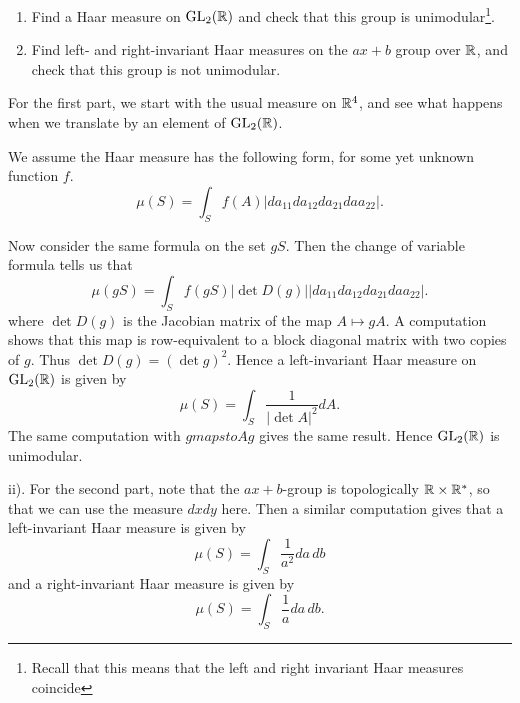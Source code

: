 \documentclass[11pt, english]{article}
\begin{document}
\begin{exc}
  \begin{enumerate}
  \item Find a Haar measure on $\operatorname{GL}_2(\mathbb{R})$ and check that this group is unimodular\footnote{Recall that this means that the left and right invariant Haar measures coincide}.
\item Find left- and right-invariant Haar measures on the $ax+b$ group over $\mathbb{R}$, and check that this group is not unimodular.
  \end{enumerate}
\end{exc}
\begin{sol}
For the first part, we start with the usual measure on $\mathbb{R}^4$, and see what happens when we translate by an element of $\operatorname{GL}_2(\mathbb{R})$. 

We assume the Haar measure has the following form, for some yet unknown function $f$.
$$
\mu(S) = \int_S f(A) \lvert da_{11} d a_{12} da_{21} da a_{22} \rvert.
$$

Now consider the same formula on the set $gS$. Then the change of variable formula tells us that
$$
\mu(gS) = \int_S f(gS) \lvert \det D(g) \rvert \lvert da_{11} d a_{12} da_{21} da a_{22} \rvert.
$$
where $\det D(g)$ is the Jacobian matrix of the map $A \mapsto gA$. A computation shows that this map is row-equivalent to a block diagonal matrix with two copies of $g$. Thus $\det D(g) = (\det g)^2$. Hence a left-invariant Haar measure on $\operatorname{GL}_2(\mathbb{R})$ is given by
$$
\mu(S) = \int_S \frac{1}{\lvert \det A\rvert ^2} dA.
$$
The same computation with $g mapsto Ag$ gives the same result. Hence $\operatorname{GL}_2(\mathbb{R})$ is unimodular.

ii). For the second part, note that the $ax+b$-group is topologically $\mathbb{R} \times \mathbb{R}^\ast$, so that we can use the measure $dxdy$ here. Then a similar computation gives that a left-invariant Haar measure is given by
$$
\mu(S) = \int_S \frac{1}{a^2} da\, db
$$
and a right-invariant Haar measure is given by
$$
\mu(S) = \int_S \frac{1}{a} da\, db.
$$
\end{sol}
\end{document}
